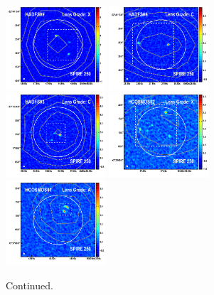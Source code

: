 \documentclass[iop]{emulateapj}
\begin{document}
\begin{figure}[!tbp] 
    \begin{centering}
\includegraphics[width=0.331\textwidth]{../Figures/overlays/HADFS09_870_250.pdf}
\includegraphics[width=0.331\textwidth]{../Figures/overlays/HADFS08_870_250.pdf}
\includegraphics[width=0.331\textwidth]{../Figures/overlays/HADFS03_870_250.pdf}
\includegraphics[width=0.331\textwidth]{../Figures/overlays/HCOSMOS02_870_250.pdf}
\includegraphics[width=0.331\textwidth]{../Figures/overlays/HCOSMOS01_870_250.pdf}
\end{centering}

\caption{ Continued.}

\end{figure}
\end{document}
